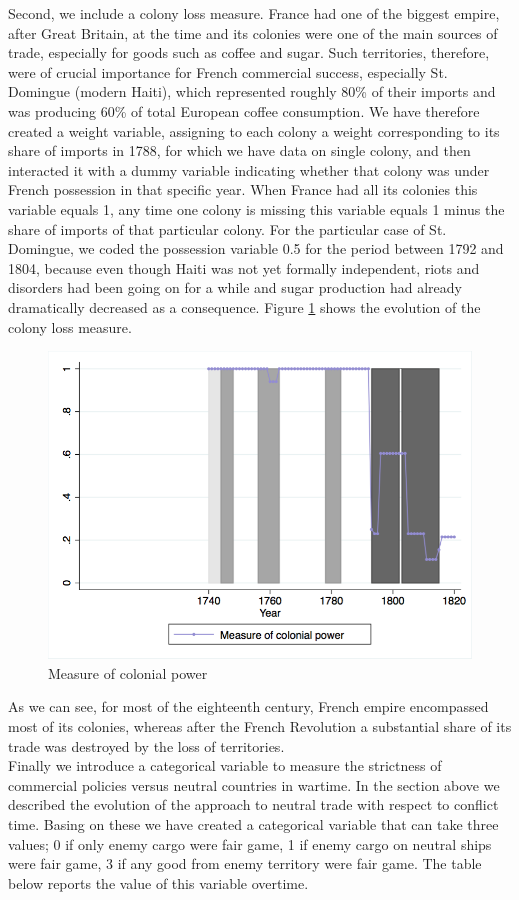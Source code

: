 \documentclass[12pt,a4paper,notitlepage,english]{article}
\begin{document}
Second, we include a colony loss measure. France had one of the biggest empire, after Great Britain, at the time and its colonies were one of the main sources of trade, especially for goods such as coffee and sugar. Such territories, therefore, were of crucial importance for French commercial success, especially St. Domingue (modern Haiti), which represented roughly 80\% of their imports and was producing 60\% of total European coffee consumption. We have therefore created a weight variable, assigning to each colony a weight corresponding to its share of imports in 1788, for which we have data on single colony, and then interacted it with a dummy variable indicating whether that colony was under French possession in that specific year. When France had all its colonies this variable equals 1, any time one colony is missing this variable equals 1 minus the share of imports of that particular colony. For the particular case of St. Domingue, we coded the possession variable 0.5 for the period between 1792 and 1804, because even though Haiti was not yet formally independent, riots and disorders had been going on for a while and sugar production had already dramatically decreased as a consequence. Figure \ref{colony_loss} shows the evolution of the colony loss measure. 
\begin{center}
\begin{figure}[H]
\caption{Measure of colonial power}
\label{colony_loss}
\includegraphics[scale=.51]{colony_loss.png}
\end{figure}
\end{center}
As we can see, for most of the eighteenth century, French empire encompassed most of its colonies, whereas after the French Revolution a substantial share of its trade was destroyed by the loss of territories. \\
Finally we introduce a categorical variable to measure the strictness of commercial policies versus neutral countries in wartime. In the section above we described the evolution of the approach to neutral trade with respect to conflict time. Basing on these we have created a categorical variable that can take three values; 0 if only enemy cargo were fair game, 1 if enemy cargo on neutral ships were fair game, 3 if any good from enemy territory  were fair game. The table below reports the value of this variable overtime. 
\end{document}

